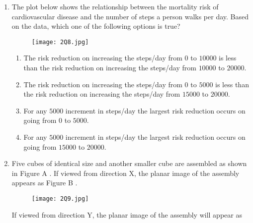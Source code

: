 \documentclass[journal,12pt,onecolumn]{article}
\theoremstyle{remark}
\begin{document}
\begin{enumerate}
    \item The plot  below shows the relationship between the mortality risk of cardiovascular
    disease and the number of steps a person walks per day. Based on the data, which
    one of the following options is true?
    \begin{figure}[H]
        \centering
        \texttt{[image: 2Q8.jpg]}
        \caption{}
        \label{fig:q8}
    \end{figure}
    
    \hfill{}
    \begin{enumerate}
        \item The risk reduction on increasing the steps/day from $0$ to $10000$ is less than the risk
        reduction on increasing the steps/day from $10000$ to $20000$.
        \item The risk reduction on increasing the steps/day from $0$ to $5000$ is less than the risk
        reduction on increasing the steps/day from $15000$ to $20000$.
        \item For any $5000$ increment in steps/day the largest risk reduction occurs on going from
        $0$ to $5000$.
        \item For any $5000$ increment in steps/day the largest risk reduction occurs on going from
        $15000$ to $20000$.
    \end{enumerate}

    \item Five cubes of identical size and another smaller cube are assembled as shown in
    Figure A . If viewed from direction X, the planar image of the assembly appears as
    Figure B .
    \begin{figure}[H]
        \centering
        \texttt{[image: 2Q9.jpg]}
        \caption{}
        \label{fig:q9a}
    \end{figure}
    
    If viewed from direction Y, the planar image of the assembly  will
    appear as
    

\end{enumerate}
\end{document}

